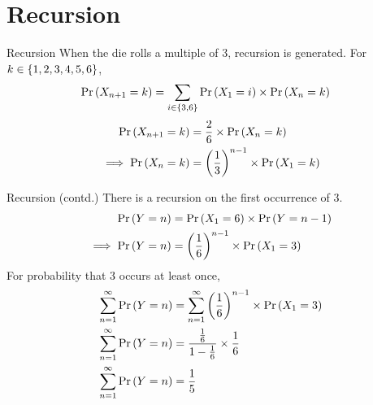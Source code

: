 \documentclass{beamer}
\begin{document}
\section{Recursion}
\begin{frame}{Recursion}
    When the die rolls a multiple of 3, recursion is generated. For $k \in \left\{1,2,3,4,5,6\right\}$,
    \begin{align}
        \Pr\left(X_{n+1}=k\right) &= \sum_{i \in \left\{3, 6\right\}}\Pr\left(X_1=i\right) \times \Pr\left(X_n=k\right)
        \label{eq:recursionX}
    \end{align}
    \begin{align}
        \Pr\left(X_{n+1}=k\right) &= \frac{2}{6} \times \Pr\left(X_n=k\right)\\
        \implies \Pr\left(X_{n}=k\right) &= \left(\frac{1}{3}\right)^{n-1} \times \Pr\left(X_1=k\right)
    \end{align}
\end{frame}
\begin{frame}{Recursion (contd.)}
    There is a recursion on the first occurrence of 3.
    \begin{align}
        \Pr\left(Y=n\right) &= \Pr\left(X_1=6\right) \times \Pr\left(Y= n-1\right) \\
        \implies \Pr\left(Y=n\right) &= \left(\frac{1}{6}\right)^{n-1} \times \Pr\left(X_1=3\right) 
        \label{eq:recursionY}
    \end{align}
    For probability that 3 occurs at least once,
    \begin{align}
        \sum_{n=1}^\infty  \Pr\left(Y=n\right) &= 
         \sum_{n=1}^\infty \left(\frac{1}{6}\right)^{n-1} \times \Pr\left(X_1=3\right) \\
        \sum_{n=1}^\infty \Pr\left(Y=n\right) &= 
         \frac{\frac{1}{6}}{1-\frac{1}{6}} \times \frac{1}{6} \\
       \sum_{n=1}^\infty \Pr\left(Y=n\right) &= \frac{1}{5}
       \label{eq:occurrence3}
    \end{align}
\end{frame}
\end{document}
